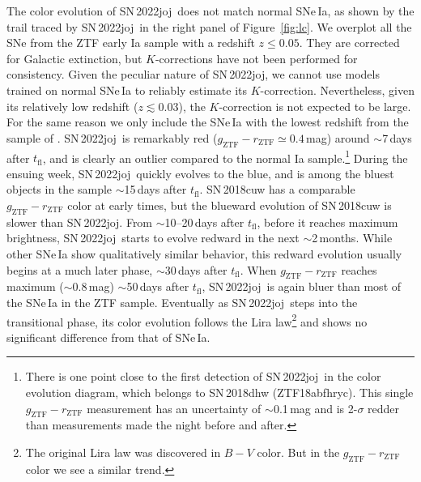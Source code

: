 \documentclass[twocolumn]{aastex631}
\newcommand{\sn}{SN\,2022joj}
\newcommand{\tfl}{$t_\mathrm{fl}$}
\begin{document}
\begin{CJK*}{UTF8}{gbsn}
The color evolution of \sn\ does not match normal SNe\,Ia, as shown by the trail traced by \sn\ in the right panel of Figure~\ref{fig:lc}. We overplot all the SNe from the ZTF early Ia sample \citep{Bulla2020} with a redshift $z\le0.05$. They are corrected for Galactic extinction, but $K$-corrections have not been performed for consistency. Given the peculiar nature of \sn, we cannot use models trained on normal SNe\,Ia to reliably estimate its $K$-correction. Nevertheless, given its relatively low redshift ($z\lesssim0.03$), the $K$-correction is not expected to be large. For the same reason we only include the SNe\,Ia with the lowest redshift from the sample of \citet{Bulla2020}. 
\sn\ is remarkably red ($g_\mathrm{ZTF} - r_\mathrm{ZTF}\simeq0.4$\,mag) around $\sim$7\,days after $t_\mathrm{fl}$, and is clearly an outlier compared to the normal Ia sample.\footnote{There is one point close to the first detection of \sn\ in the color evolution diagram, which belongs to SN\,2018dhw (ZTF18abfhryc). This single $g_\mathrm{ZTF}-r_\mathrm{ZTF}$ measurement has an uncertainty of $\sim$0.1\,mag and is 2-$\sigma$ redder than measurements made the night before and after.} 
During the ensuing week, \sn\ quickly evolves to the blue, and is among the bluest objects in the sample $\sim$15\,days after $t_\mathrm{fl}$. SN\,2018cuw has a comparable $g_\mathrm{ZTF} - r_\mathrm{ZTF}$ color at early times, but the blueward evolution of SN\,2018cuw is slower than \sn. 
From $\sim$10--20\,days after \tfl, before it reaches maximum brightness, \sn\ starts to evolve redward in the next $\sim$2\,months. While other SNe\,Ia show qualitatively similar behavior, this redward evolution usually begins at a much later phase, $\sim$30\,days after \tfl. %
When $g_\mathrm{ZTF} - r_\mathrm{ZTF}$ reaches maximum ($\sim$0.8\,mag) $\sim$50\,days after \tfl, \sn\ is again bluer than most of the SNe\,Ia in the ZTF sample. 
Eventually as \sn\ steps into the transitional phase, its color evolution follows the Lira law\footnote{The original Lira law was discovered in $B-V$ color. But in the $g_\mathrm{ZTF}-r_\mathrm{ZTF}$ color we see a similar trend.} \citep{Lira_1996,Phillips_1999} and shows no significant difference from that of SNe\,Ia.


\end{CJK*}
\end{document}
